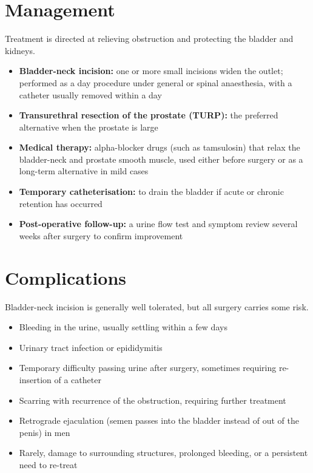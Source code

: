 \section*{Management}
Treatment is directed at relieving obstruction and protecting the bladder and kidneys.

\begin{itemize}
    \item \textbf{Bladder-neck incision:} one or more small incisions widen the outlet; performed as a day procedure under general or spinal anaesthesia, with a catheter usually removed within a day
    \item \textbf{Transurethral resection of the prostate (TURP):} the preferred alternative when the prostate is large
    \item \textbf{Medical therapy:} alpha-blocker drugs (such as tamsulosin) that relax the bladder-neck and prostate smooth muscle, used either before surgery or as a long-term alternative in mild cases
    \item \textbf{Temporary catheterisation:} to drain the bladder if acute or chronic retention has occurred
    \item \textbf{Post-operative follow-up:} a urine flow test and symptom review several weeks after surgery to confirm improvement
\end{itemize}

\section*{Complications}
Bladder-neck incision is generally well tolerated, but all surgery carries some risk.

\begin{itemize}
    \item Bleeding in the urine, usually settling within a few days
    \item Urinary tract infection or epididymitis
    \item Temporary difficulty passing urine after surgery, sometimes requiring re-insertion of a catheter
    \item Scarring with recurrence of the obstruction, requiring further treatment
    \item Retrograde ejaculation (semen passes into the bladder instead of out of the penis) in men
    \item Rarely, damage to surrounding structures, prolonged bleeding, or a persistent need to re-treat
\end{itemize}

